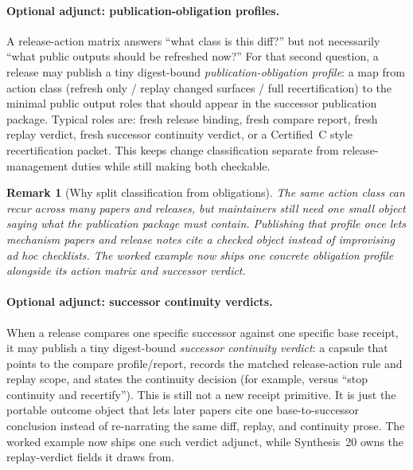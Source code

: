 \documentclass[11pt]{article}
\newtheorem{remark}{Remark}
\begin{document}
\paragraph{Optional adjunct: publication-obligation profiles.}
A release-action matrix answers ``what class is this diff?'' but not necessarily ``what public outputs should be refreshed now?'' For that second question, a release may publish a tiny digest-bound \emph{publication-obligation profile}: a map from action class (refresh only / replay changed surfaces / full recertification) to the minimal public output roles that should appear in the successor publication package. Typical roles are: fresh release binding, fresh compare report, fresh replay verdict, fresh successor continuity verdict, or a Certified~C style recertification packet. This keeps change classification separate from release-management duties while still making both checkable.

\begin{remark}[Why split classification from obligations]
The same action class can recur across many papers and releases, but maintainers still need one small object saying what the publication package must contain. Publishing that profile once lets mechanism papers and release notes cite a checked object instead of improvising ad hoc checklists. The worked example now ships one concrete obligation profile alongside its action matrix and successor verdict.\cite{series:workedexample,series:auditorreplay}
\end{remark}

\paragraph{Optional adjunct: successor continuity verdicts.}
When a release compares one specific successor against one specific base receipt, it may publish a tiny digest-bound \emph{successor continuity verdict}: a capsule that points to the compare profile/report, records the matched release-action rule and replay scope, and states the continuity decision (for example,  versus ``stop continuity and recertify''). This is still not a new receipt primitive. It is just the portable outcome object that lets later papers cite one base-to-successor conclusion instead of re-narrating the same diff, replay, and continuity prose. The worked example now ships one such verdict adjunct, while Synthesis~20 owns the replay-verdict fields it draws from.\cite{series:workedexample,series:auditorreplay}
\end{document}
